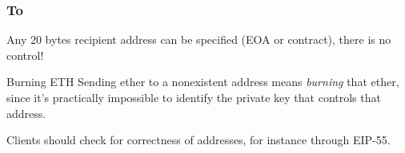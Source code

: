 \documentclass[11pt]{beamer}  %
\begin{document}
\begin{frame}\frametitle{To}

  Any $20$ bytes recipient address can be specified (EOA or contract),
  there is no control!

  \bigskip

  \begin{redbox}{Burning ETH}
    Sending ether to a nonexistent address means \emph{burning} that ether,
    since it's practically impossible to identify the private key
    that controls that address.
  \end{redbox}

  \bigskip

  Clients should check for correctness of addresses, for instance
  through EIP-55.
\end{frame}
\end{document}
